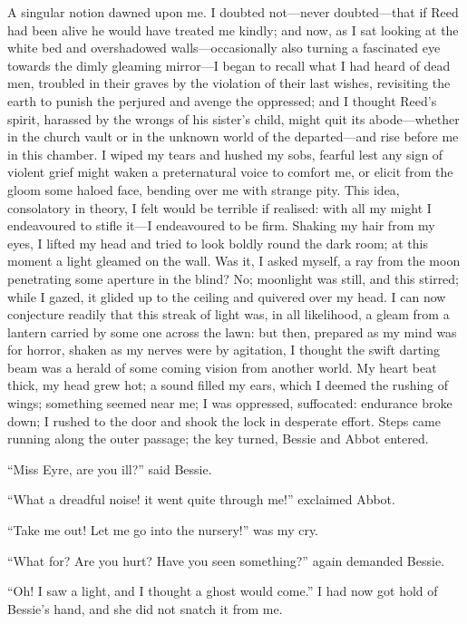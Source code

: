 A singular notion dawned upon me.  I doubted not---never doubted---that
if \Mr{} Reed had been alive he would have treated me kindly; and now, as
I sat looking at the white bed and overshadowed walls---occasionally
also turning a fascinated eye towards the dimly gleaming mirror---I
began to recall what I had heard of dead men, troubled in their graves
by the violation of their last wishes, revisiting the earth to punish
the perjured and avenge the oppressed; and I thought \Mr{} Reed's spirit,
harassed by the wrongs of his sister's child, might quit its
abode---whether in the church vault or in the unknown world of the
departed---and rise before me in this chamber.  I wiped my tears and
hushed my sobs, fearful lest any sign of violent grief might waken a
preternatural voice to comfort me, or elicit from the gloom some haloed
face, bending over me with strange pity.  This idea, consolatory in
theory, I felt would be terrible if realised: with all my might I
endeavoured to stifle it---I endeavoured to be firm.  Shaking my hair
from my eyes, I lifted my head and tried to look boldly round the dark
room; at this moment a light gleamed on the wall.  Was it, I asked
myself, a ray from the moon penetrating some aperture in the blind?  No;
moonlight was still, and this stirred; while I gazed, it glided up to
the ceiling and quivered over my head.  I can now conjecture readily
that this streak of light was, in all likelihood, a gleam from a lantern
carried by some one across the lawn: but then, prepared as my mind was
for horror, shaken as my nerves were by agitation, I thought the swift
darting beam was a herald of some coming vision from another world.  My
heart beat thick, my head grew hot; a sound filled my ears, which I
deemed the rushing of wings; something seemed near me; I was oppressed,
suffocated: endurance broke down; I rushed to the door and shook the
lock in desperate effort.  Steps came running along the outer passage;
the key turned, Bessie and Abbot entered.

\enquote{Miss Eyre, are you ill?} said Bessie.

\enquote{What a dreadful noise! it went quite through me!} exclaimed
Abbot.

\enquote{Take me out!  Let me go into the nursery!} was my cry.

\enquote{What for?  Are you hurt?  Have you seen something?} again
demanded Bessie.

\enquote{Oh!  I saw a light, and I thought a ghost would come.}  I had
now got hold of Bessie's hand, and she did not snatch it from me.

